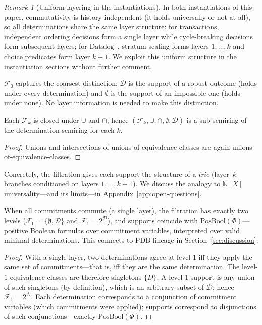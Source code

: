 \documentclass[acmsmall,review,anonymous]{acmart}
\theoremstyle{remark}
\newtheorem{remark}{Remark}
\numberwithin{definition}{section}
\numberwithin{theorem}{section}
\numberwithin{lemma}{section}
\numberwithin{corollary}{section}
\numberwithin{remark}{section}
\numberwithin{example}{section}
\numberwithin{observation}{section}
\numberwithin{assumption}{section}
\begin{document}
\begin{remark}[Uniform layering in the instantiations]
  \label{rem:uniform-layering}
  In both instantiations of this paper, commutativity is
  history-independent (it holds universally or not at all), so all
  determinations share the same layer structure: for transactions,
  independent ordering decisions form a single layer while
  cycle-breaking decisions form subsequent layers; for
  $\mbox{Datalog}^\neg$, stratum sealing forms layers $1, \ldots, k$
  and choice predicates form layer $k{+}1$.
  We exploit this uniform structure in the instantiation sections
  without further comment.
\end{remark}

\noindent
$\mathcal{F}_0$ captures the coarsest distinction: $\mathcal{D}$ is the
support of a robust outcome (holds under every determination) and
$\emptyset$ is the support of an impossible one (holds under none).
No layer information is needed to make this distinction.

\begin{proposition}
  \label{prop:filtration-semiring}
  Each $\mathcal{F}_k$ is closed under $\cup$ and $\cap$, hence
  $(\mathcal{F}_k, \cup, \cap, \emptyset, \mathcal{D})$ is a
  sub-semiring of the determination semiring for each $k$.
\end{proposition}
\begin{proof}
  Unions and intersections of unions-of-equivalence-classes are again
  unions-of-equivalence-classes.
\end{proof}

\noindent
Concretely, the filtration gives each support the structure of a
\emph{trie} (layer~$k$ branches conditioned on layers $1,\ldots,k{-}1$).
We discuss the analogy to $\mathbb{N}[X]$ universality---and its
limits---in Appendix~\ref{app:open-questions}.

\begin{proposition}
  \label{prop:collapse-depth-1}
  When all commitments commute (a single layer), the filtration has
  exactly two levels ($\mathcal{F}_0 = \{\emptyset, \mathcal{D}\}$ and
  $\mathcal{F}_1 = 2^{\mathcal{D}}$), and supports coincide with
  $\mathrm{PosBool}(\Phi)$---positive Boolean formulas over commitment
  variables, interpreted over valid minimal determinations.
  This connects to PDB lineage in Section~\ref{sec:discussion}.
\end{proposition}
\begin{proof}
  With a single layer, two determinations agree at level $1$ iff they
  apply the same set of commitments---that is, iff they are the same
  determination.
  The level-$1$ equivalence classes are therefore singletons $\{D\}$.
  A level-$1$ support is any union of such singletons (by definition),
  which is an arbitrary subset of $\mathcal{D}$; hence
  $\mathcal{F}_1 = 2^{\mathcal{D}}$.
  Each determination corresponds to a conjunction of commitment variables
  (which commitments were applied); supports correspond to disjunctions
  of such conjunctions---exactly $\mathrm{PosBool}(\Phi)$.
\end{proof}
\end{document}
